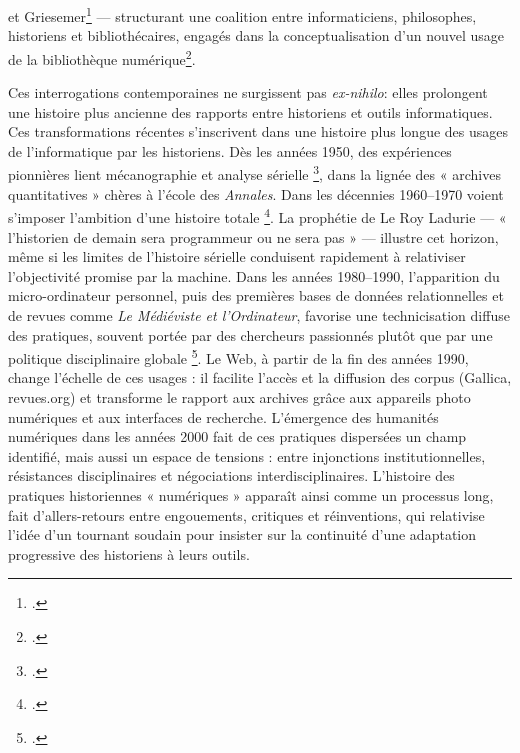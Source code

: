 et Griesemer\footcite[][]{trompette} — structurant une coalition entre informaticiens, philosophes, historiens et bibliothécaires, engagés dans la conceptualisation d’un nouvel usage de la bibliothèque numérique\footcite[][]{bequet}.

Ces interrogations contemporaines ne surgissent pas \emph{ex-nihilo}: elles prolongent une histoire plus ancienne des rapports entre historiens et outils informatiques. Ces transformations récentes s’inscrivent dans une histoire plus longue des usages de l’informatique par les historiens. Dès les années 1950, des expériences pionnières lient mécanographie et analyse sérielle \footcite[][]{daumard}, dans la lignée des « archives quantitatives » chères à l’école des \emph{Annales}. Dans les décennies 1960–1970 voient s’imposer l’ambition d’une histoire totale \footcite[][]{poublanc}. La prophétie de Le Roy Ladurie — « l’historien de demain sera programmeur ou ne sera pas » — illustre cet horizon, même si les limites de l’histoire sérielle conduisent rapidement à relativiser l’objectivité promise par la machine. Dans les années 1980–1990, l’apparition du micro-ordinateur personnel, puis des premières bases de données relationnelles et de revues comme \emph{Le Médiéviste et l’Ordinateur}, favorise une technicisation diffuse des pratiques, souvent portée par des chercheurs passionnés plutôt que par une politique disciplinaire globale \footcite[][]{poublanc}. Le Web, à partir de la fin des années 1990, change l’échelle de ces usages : il facilite l’accès et la diffusion des corpus (Gallica, revues.org) et transforme le rapport aux archives grâce aux appareils photo numériques et aux interfaces de recherche. L’émergence des humanités numériques dans les années 2000 fait de ces pratiques dispersées un champ identifié, mais aussi un espace de tensions : entre injonctions institutionnelles, résistances disciplinaires et négociations interdisciplinaires. L’histoire des pratiques historiennes « numériques » apparaît ainsi comme un processus long, fait d’allers-retours entre engouements, critiques et réinventions, qui relativise l’idée d’un tournant soudain pour insister sur la continuité d’une adaptation progressive des historiens à leurs outils.

